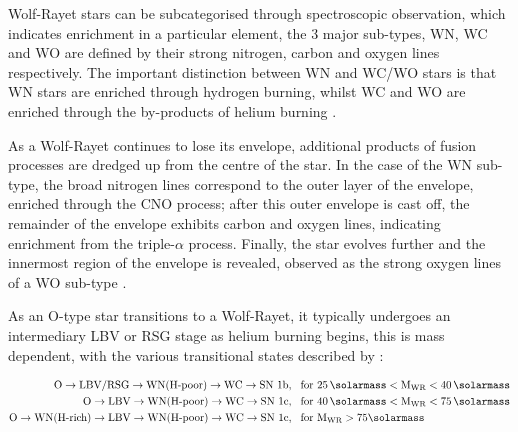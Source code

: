 
Wolf-Rayet stars can be subcategorised through spectroscopic observation, which indicates enrichment in a particular element, the 3 major sub-types, WN, WC and WO are defined by their strong nitrogen, carbon and oxygen lines respectively.
The important distinction between WN and WC/WO stars is that WN stars are enriched through hydrogen burning, whilst WC and WO are enriched through the by-products of helium burning \parencite{vinkVeryMassiveStars2015}.

As a Wolf-Rayet continues to lose its envelope, additional products of fusion processes are dredged up from the centre of the star.
In the case of the WN sub-type, the broad nitrogen lines correspond to the outer layer of the envelope, enriched through the CNO process; after this outer envelope is cast off, the remainder of the envelope exhibits carbon and oxygen lines, indicating enrichment from the triple-$\alpha$ process.
Finally, the star evolves further and the innermost region of the envelope is revealed, observed as the strong oxygen lines of a WO sub-type \parencite{neugentWolfRayetContent2019,oswaltPlanetsStarsStellar2013}.


As an O-type star transitions to a Wolf-Rayet, it typically undergoes an intermediary LBV or RSG stage as helium burning begins, this is mass dependent, with the various transitional states described by \cite{crowther_physical_2007}:

\begin{subequations}
  \begin{align*}
    \text{O} \rightarrow \text{LBV/RSG} \rightarrow \text{WN(H-poor)} \rightarrow \text{WC} \rightarrow \text{SN 1b} & ,~~ \text{for } 25 \, \si{\solarmass} < \text{M}_{\text{WR}} < 40 \, \si{\solarmass} \\
    \text{O} \rightarrow \text{LBV} \rightarrow \text{WN(H-poor)} \rightarrow \text{WC} \rightarrow \text{SN 1c} & ,~~ \text{for } 40 \, \si{\solarmass} < \text{M}_{\text{WR}} < 75 \, \si{\solarmass} \\
    \text{O} \rightarrow \text{WN(H-rich)} \rightarrow \text{LBV} \rightarrow \text{WN(H-poor)} \rightarrow \text{WC} \rightarrow \text{SN 1c} & ,~~ \text{for } \text{M}_{\text{WR}} > 75 \si{\solarmass} 
  \end{align*}  
\end{subequations}

